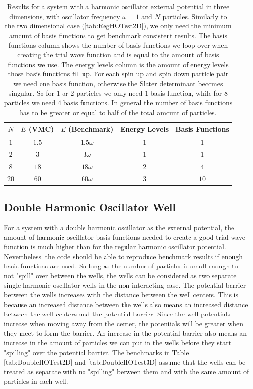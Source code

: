 \documentclass[../main.tex]{subfiles}
\begin{document}
\begin{table}[!ht]
  \centering
  \begin{tabular}{ | c | c | c | c | c | }
    \hline
    $N$ & $E$ (VMC) & $E$ (Benchmark) &  Energy Levels & Basis Functions\\*
    \hline
    $1$ & $1.5$ & $1.5\omega$ & $1$ & $1$ \\*
    \hline
    $2$ & $3$ & $3\omega$ & $1$ & $1$ \\*
    \hline
    $8$ & $18$ & $18\omega$ & $2$ & $4$ \\*
    \hline
    $20$ & $60$ & $60\omega$ & $3$ & $10$ \\*
    \hline
  \end{tabular}
  \caption{Results for a system with a harmonic oscillator external potential in three dimensions, with oscillator frequency $\omega = 1$ and $N$ particles. Similarly to the two dimensional case (\ref{tab:RegHOTest2D}), we only need the minimum amount of basis functions to get benchmark consistent results. The basis functions column shows the number of basis functions we loop over when creating the trial wave function and is equal to the amount of basis functions we use. The energy levels column is the amount of energy levels those basis functions fill up. For each spin up and spin down particle pair we need one basis function, otherwise the Slater determinant becomes singular. So for $1$ or $2$ particles we only need $1$ basis function, while for $8$ particles we need $4$ basis functions. In general the number of basis functions has to be greater or equal to half of the total amount of particles.}
  \label{tab:RegHOTest3D}
\end{table}

\subsection{Double Harmonic Oscillator Well}

For a system with a double harmonic oscillator as the external potential, the amount of harmonic oscillator basis functions needed to create a good trial wave function is much higher than for the regular harmonic oscillator potential. Nevertheless, the code should be able to reproduce benchmark results if enough basis functions are used. So long as the number of particles is small enough to not "spill" over between the wells, the wells can be considered as two separate single harmonic oscillator wells in the non-interacting case. The potential barrier between the wells increases with the distance between the well centers. This is because an increased distance between the wells also means an increased distance between the well centers and the potential barrier. Since the well potentials increase when moving away from the center, the potentials will be greater when they meet to form the barrier. An increase in the potential barrier also means an increase in the amount of particles we can put in the wells before they start "spilling" over the potential barrier. The benchmarks in Table \ref{tab:DoubleHOTest2D} and \ref{tab:DoubleHOTest3D} assume that the wells can be treated as separate with no "spilling" between them and with the same amount of particles in each well. 
\end{document}
